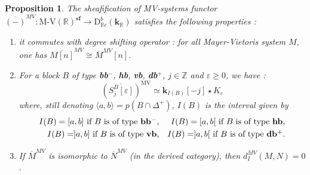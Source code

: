 \documentclass[a4paper, english, 11pt]{article}
\newcommand{\kk}[0]{\textbf{k}}
\newcommand{\0}{\vec{0}}
\newcommand{\R}[0]{\mathbb{R}}
\newcommand{\Z}[0]{\mathbb{Z}}
\newcommand{\D}[0]{\text{D}}
\newcommand{\MV}{\text{MV}}
\newcommand{\s}{\textbf{sf}}
\newtheorem{prop}{Proposition}[section]
\begin{document}
\begin{prop}\label{P:PropertiesofMVSheafification}
The sheafification of MV-systems functor $\overline{(-)}^{MV}: \text{M-V}(\R)^{\s} \to  \D^b_{\R c}(\kk_\R)$ satisfies the following properties : 
\begin{enumerate}
    \item it commutes with degree shifting operator : for all Mayer-Vietoris system $M$, one has $\overline{M[n]}^{MV} \cong \overline{M}^{MV}[n]$. 
    \item For  a block $B$ of type \textbf{bb$^-$}, \textbf{hb}, \textbf{vb}, \textbf{db}$^{+}$, $j\in \Z$ and $\varepsilon \geq 0$, we have : $$(\overline{S_j^B [\varepsilon]})^{\MV} \simeq \kk_{I(B)}[-j] \star K_\varepsilon $$ 
    where, still denoting  $\langle a, b\rangle=p(B\cap \Delta^+)$, $I(B)$ is the interval given by \begin{eqnarray*} I(B)= [a,b] \mbox{ if $B$ is of type \textbf{bb}$^{-}$,} & &  I(B)= [a,b[ 
    \mbox{ if $B$ is of type \textbf{hb},} \\
      I(B)= ]a,b] \mbox{ if $B$ is of type \textbf{vb},} & &  I(B)= ]a,b[ \mbox{ if $B$ is of type \textbf{db}$^{+}$.}                                                                                                                                                                                      \end{eqnarray*}

    
    \item If $\overline{M}^{MV}$ is isomorphic to  $\overline{N}^{MV}$ (in the derived category), then $d_I^{MV}(M, N) =0$.
 \end{enumerate}
\end{prop}
\end{document}
